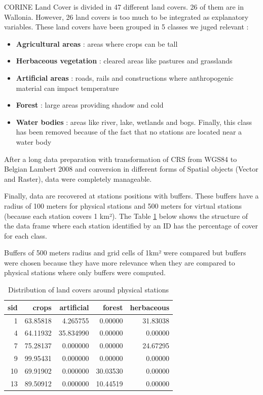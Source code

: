 \documentclass[12pt,twoside]{reedthesis}
\theoremstyle{definition}
\theoremstyle{definition}
\theoremstyle{definition}
\theoremstyle{remark}
\begin{document}
CORINE Land Cover is divided in 47 different land covers. 26 of them are
in Wallonia. However, 26 land covers is too much to be integrated as
explanatory variables. These land covers have been grouped in 5 classes
we juged relevant :
\begin{itemize}
\item
  \textbf{Agricultural areas} : areas where crops can be tall
\item
  \textbf{Herbaceous vegetation} : cleared areas like pastures and
  grasslands
\item
  \textbf{Artificial areas} : roads, rails and constructions where
  anthropogenic material can impact temperature
\item
  \textbf{Forest} : large areas providing shadow and cold
\item
  \textbf{Water bodies} : areas like river, lake, wetlands and bogs.
  Finally, this class has been removed because of the fact that no
  stations are located near a water body
\end{itemize}
After a long data preparation with transformation of CRS from WGS84 to
Belgian Lambert 2008 and conversion in different forms of Spatial
objects (Vector and Raster), data were completely manageable.

Finally, data are recovered at stations positions with buffers. These
buffers have a radius of 100 meters for physical stations and 500 meters
for virtual stations (because each station covers 1 km²). The Table
\ref{tab:clcperc} below shows the structure of the data frame where each
station identified by an ID has the percentage of cover for each class.

Buffers of 500 meters radius and grid cells of 1km² were compared but
buffers were chosen because they have more relevance when they are
compared to physical stations where only buffers were computed.
\begin{table}

\caption{\label{tab:clcperc}Distribution of land covers around physical stations}
\centering
\begin{tabular}[t]{rrrrr}
\toprule
\textbf{sid} & \textbf{crops} & \textbf{artificial} & \textbf{forest} & \textbf{herbaceous}\\
\midrule
1 & 63.85818 & 4.265755 & 0.00000 & 31.83038\\
4 & 64.11932 & 35.834990 & 0.00000 & 0.00000\\
7 & 75.28137 & 0.000000 & 0.00000 & 24.67295\\
9 & 99.95431 & 0.000000 & 0.00000 & 0.00000\\
10 & 69.91902 & 0.000000 & 30.03530 & 0.00000\\
13 & 89.50912 & 0.000000 & 10.44519 & 0.00000\\
\bottomrule
\end{tabular}
\end{table}
\end{document}
